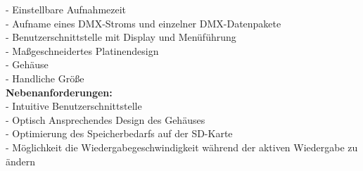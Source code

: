 - Einstellbare Aufnahmezeit\\
- Aufname eines DMX-Stroms und einzelner DMX-Datenpakete\\
- Benutzerschnittstelle mit Display und Menüführung\\
- Maßgeschneidertes Platinendesign\\
- Gehäuse\\
- Handliche Größe\\
\newline
\textbf{Nebenanforderungen:}\\
- Intuitive Benutzerschnittstelle\\
- Optisch Ansprechendes Design des Gehäuses\\
- Optimierung des Speicherbedarfs auf der SD-Karte\\
- Möglichkeit die Wiedergabegeschwindigkeit während der aktiven Wiedergabe zu ändern\\